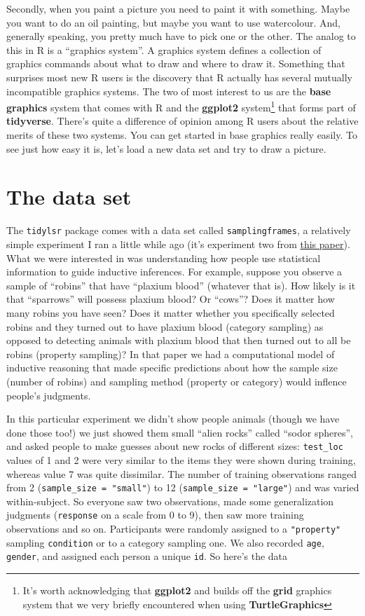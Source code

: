 \documentclass[]{book}
\let\rmarkdownfootnote\footnote%
\def\footnote{\protect\rmarkdownfootnote}
\begin{document}
Secondly, when you paint a picture you need to paint it with something. Maybe you want to do an oil painting, but maybe you want to use watercolour. And, generally speaking, you pretty much have to pick one or the other. The analog to this in R is a ``graphics system''. A graphics system defines a collection of graphics commands about what to draw and where to draw it. Something that surprises most new R users is the discovery that R actually has several mutually incompatible graphics systems. The two of most interest to us are the \textbf{base graphics} system that comes with R and the \textbf{ggplot2} system\footnote{It's worth acknowledging that \textbf{ggplot2} and builds off the \textbf{grid} graphics system that we very briefly encountered when using \textbf{TurtleGraphics}} that forms part of \textbf{tidyverse}. There's quite a difference of opinion among R users about the relative merits of these two systems. You can get started in base graphics really easily. To see just how easy it is, let's load a new data set and try to draw a picture.

\hypertarget{the-data-set}{%
\section{The data set}\label{the-data-set}}

The \texttt{tidylsr} package comes with a data set called \texttt{samplingframes}, a relatively simple experiment I ran a little while ago (it's experiment two from \href{https://psyarxiv.com/2m83v/}{this paper}). What we were interested in was understanding how people use statistical information to guide inductive inferences. For example, suppose you observe a sample of ``robins'' that have ``plaxium blood'' (whatever that is). How likely is it that ``sparrows'' will possess plaxium blood? Or ``cows''? Does it matter how many robins you have seen? Does it matter whether you specifically selected robins and they turned out to have plaxium blood (category sampling) as opposed to detecting animals with plaxium blood that then turned out to all be robins (property sampling)? In that paper we had a computational model of inductive reasoning that made specific predictions about how the sample size (number of robins) and sampling method (property or category) would inflence people's judgments.

In this particular experiment we didn't show people animals (though we have done those too!) we just showed them small ``alien rocks'' called ``sodor spheres'', and asked people to make guesses about new rocks of different sizes: \texttt{test\_loc} values of 1 and 2 were very similar to the items they were shown during training, whereas value 7 was quite dissimilar. The number of training observations ranged from 2 (\texttt{sample\_size\ =\ "small"}) to 12 (\texttt{sample\_size\ =\ "large"}) and was varied within-subject. So everyone saw two observations, made some generalization judgments (\texttt{response} on a scale from 0 to 9), then saw more training observations and so on. Participants were randomly assigned to a \texttt{"property"} sampling \texttt{condition} or to a category sampling one. We also recorded \texttt{age}, \texttt{gender}, and assigned each person a unique \texttt{id}. So here's the data
\end{document}
